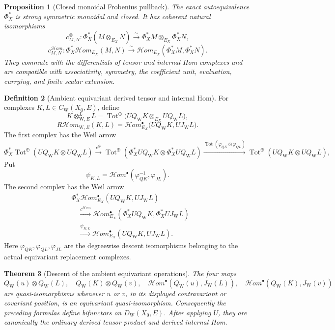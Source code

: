\documentclass[10pt]{article}
\newtheorem{theorem}{Theorem}[section]
\newtheorem{proposition}[theorem]{Proposition}
\theoremstyle{definition}
\newtheorem{definition}[theorem]{Definition}
\begin{document}
\begin{proposition}[Closed monoidal Frobenius pullback]
The exact autoequivalence \(\Phi_X^*\) is strong symmetric monoidal and
closed.  It has coherent natural isomorphisms
\[
 c^\otimes_{M,N}:\Phi_X^*(M\otimes_{E_X}N)
   \xrightarrow{\sim}\Phi_X^*M\otimes_{E_X}\Phi_X^*N,
\]
\[
 c^{\mathcal Hom}_{M,N}:
 \Phi_X^*\mathcal Hom_{E_X}(M,N)
 \xrightarrow{\sim}
 \mathcal Hom_{E_X}(\Phi_X^*M,\Phi_X^*N).
\]
They commute with the differentials of tensor and internal-Hom complexes
and are compatible with associativity, symmetry, the coefficient unit,
evaluation, currying, and finite scalar extension.
\end{proposition}

\begin{definition}[Ambient equivariant derived tensor and internal Hom]
For complexes \(K,L\in C_{\mathrm W}(X_0,E)\), define
\[
 K\otimes_{\mathrm W,E}^LL
 =\operatorname{Tot}^{\oplus}
    \bigl(UQ_{\mathrm W}K\otimes_{E_X}UQ_{\mathrm W}L\bigr),
\]
\[
 R\mathcal Hom_{\mathrm W,E}(K,L)
 =\mathcal Hom_{E_X}^\bullet
    \bigl(UQ_{\mathrm W}K,UJ_{\mathrm W}L\bigr).
\]
The first complex has the Weil arrow
\[
 \Phi_X^*\operatorname{Tot}^{\oplus}
   (UQ_{\mathrm W}K\otimes UQ_{\mathrm W}L)
 \xrightarrow{c^\otimes}
 \operatorname{Tot}^{\oplus}
   (\Phi_X^*UQ_{\mathrm W}K\otimes\Phi_X^*UQ_{\mathrm W}L)
 \xrightarrow{\operatorname{Tot}(\varphi_{QK}\otimes\varphi_{QL})}
 \operatorname{Tot}^{\oplus}
   (UQ_{\mathrm W}K\otimes UQ_{\mathrm W}L),
\]
Put
\[
 \psi_{K,L}=\mathcal Hom^\bullet
   (\varphi_{QK}^{-1},\varphi_{JL}).
\]
The second complex has the Weil arrow
\[
 \begin{aligned}
 &\Phi_X^*\mathcal Hom_{E_X}^\bullet
   (UQ_{\mathrm W}K,UJ_{\mathrm W}L)\\
 &\quad\xrightarrow{c^{\mathcal Hom}}
 \mathcal Hom_{E_X}^\bullet
   (\Phi_X^*UQ_{\mathrm W}K,\Phi_X^*UJ_{\mathrm W}L)\\
 &\quad\xrightarrow{\psi_{K,L}}
 \mathcal Hom_{E_X}^\bullet
   (UQ_{\mathrm W}K,UJ_{\mathrm W}L).
 \end{aligned}
\]
Here \(\varphi_{QK},\varphi_{QL},\varphi_{JL}\) are the degreewise descent
isomorphisms belonging to the actual equivariant replacement complexes.
\end{definition}

\begin{theorem}[Descent of the ambient equivariant operations]
The four maps
\[
 Q_{\mathrm W}(u)\otimes Q_{\mathrm W}(L),\quad
 Q_{\mathrm W}(K)\otimes Q_{\mathrm W}(v),\quad
 \mathcal Hom^\bullet(Q_{\mathrm W}(u),J_{\mathrm W}(L)),\quad
 \mathcal Hom^\bullet(Q_{\mathrm W}(K),J_{\mathrm W}(v))
\]
are quasi-isomorphisms whenever \(u\) or \(v\), in its displayed
contravariant or covariant position, is an equivariant quasi-isomorphism.
Consequently the preceding formulas define bifunctors on
\(D_{\mathrm W}(X_0,E)\).  After applying \(U\), they are canonically the
ordinary derived tensor product and derived internal Hom.
\end{theorem}
\end{document}
